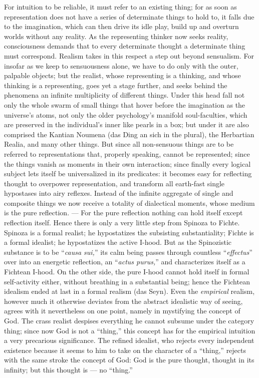 \documentclass[12pt]{book}
\begin{document}
For intuition to be reliable, it must refer to an existing thing; for as
soon as representation does not have a series of determinate things to hold
to, it falls due to the imagination, which can then drive its idle play,
build up and overturn worlds without any reality. As the representing
thinker now seeks reality, consciousness demands that to every determinate
thought a determinate thing must correspond. Realism takes in this respect a
step out beyond sensualism. For insofar as we keep to sensuousness alone, we
have to do only with the outer, palpable objects; but the realist, whose
representing is a thinking, and whose thinking is a representing, goes yet a
stage further, and seeks behind the phenomena an infinite multiplicity of
different things. Under this head fall not only the whole swarm of small
things that hover before the imagination as the universe's atoms, not only
the older psychology's manifold soul-faculties, which are preserved in the
individual's inner like pearls in a box; but under it are also comprised the
Kantian Noumena (das Ding an sich in the plural), the Herbartian Realia, and
many other things. But since all non-sensuous things are to be referred to
representations that, properly speaking, cannot be represented; since the
things vanish as moments in their own interaction; since finally every
logical subject lets itself be universalized in its predicates: it becomes
easy for reflecting thought to overpower representation, and transform all
earth-fast single hypostases into airy reflexes. Instead of the infinite
aggregate of single and composite things we now receive a totality of
dialectical moments, whose medium is the pure reflection. --- For the pure
reflection nothing can hold itself except reflection itself. Hence there is
only a very little step from Spinoza to Fichte. Spinoza is a formal realist;
he hypostatizes the subsisting substantiality; Fichte is a formal idealist;
he hypostatizes the active I-hood. But as the Spinozistic substance is to be
``\textit{causa sui,}'' its calm being passes through countless
``\textit{effectus}'' over into an energetic reflection, an
``\textit{actus purus,}'' and characterizes itself as a Fichtean I-hood. On
the other side, the pure I-hood cannot hold itself in formal self-activity
either, without breathing in a substantial being; hence the Fichtean
idealism ended at last in a formal realism (das Seyn). Even the
\emph{empirical} realism, however much it otherwise deviates from the
abstract idealistic way of seeing, agrees with it nevertheless on one point,
namely in mystifying the concept of God. The crass realist despises
everything he cannot subsume under the category thing; since now God is not
a ``thing,'' this concept has for the empirical intuition a very precarious
significance. The refined idealist, who rejects every independent existence
because it seems to him to take on the character of a ``thing,'' rejects
with the same stroke the concept of God: God is the pure thought, thought in
its infinity; but this thought is --- no ``thing.''
\end{document}
